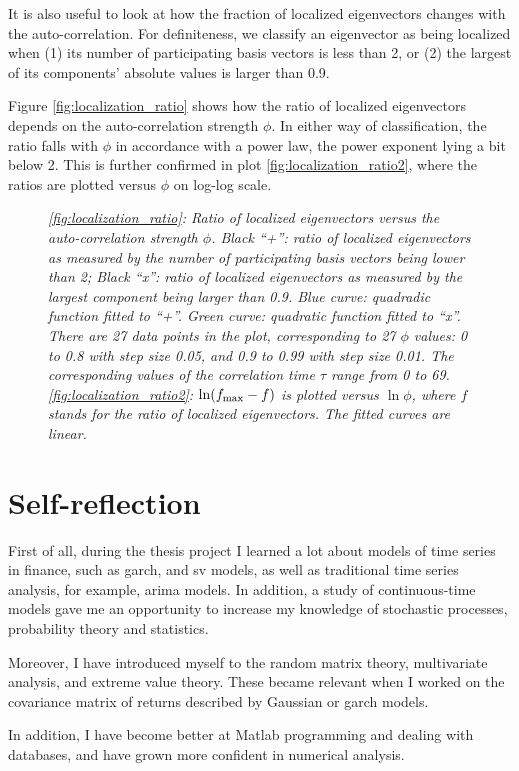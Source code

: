 \documentclass{report}
\begin{document}
It is also useful to look at how the fraction of localized eigenvectors
changes with the auto-correlation. For definiteness, we classify
an eigenvector as being localized when (1) its number of participating
basis vectors is less than 2, or (2) the largest of its components'
absolute values is larger than 0.9.

Figure \ref{fig:localization_ratio} shows how the ratio of localized
eigenvectors depends on the auto-correlation strength $\phi$. In
either way of classification, the ratio falls with $\phi$ in
accordance with a power law, the power exponent lying a bit below 2.
This is further confirmed in plot \ref{fig:localization_ratio2}, where
the ratios are plotted versus $\phi$ on log-log scale.
\begin{figure}[htb!]
  \centering
  \caption{\small \it \ref{fig:localization_ratio}: Ratio of localized
    eigenvectors versus the auto-correlation strength $\phi$. Black
    ``+'': ratio of localized eigenvectors as measured by the number
    of participating basis vectors being lower than 2; Black ``x'':
    ratio of localized eigenvectors as measured by the largest
    component being larger than 0.9. Blue curve: quadradic function
    fitted to ``+''. Green curve: quadratic function fitted to
    ``x''. There are 27 data points in the plot, corresponding to 27
    $\phi$ values: 0 to 0.8 with step size 0.05, and 0.9 to 0.99 with
    step size 0.01. The corresponding values of the correlation time
    $\tau$ range from 0 to 69. \ref{fig:localization_ratio2}: $\ln
    (f_{\text{max}} - f)$ is plotted versus $\ln \phi$, where $f$ stands for the
    ratio of localized eigenvectors. The fitted curves are linear.}
\end{figure}



\chapter{Self-reflection}
First of all, during the thesis project I learned a lot about models
of time series in finance, such as \gls{garch}, and \gls{sv} models,
as well as traditional time series analysis, for example, \gls{arima}
models. In addition, a study of continuous-time models gave me an
opportunity to increase my knowledge of stochastic processes,
probability theory and statistics.

Moreover, I have introduced myself to the random matrix theory,
multivariate analysis, and extreme value theory. These became relevant
when I worked on the covariance matrix of returns described by
Gaussian or \gls{garch} models.

In addition, I have become better at Matlab programming and dealing
with databases, and have grown more confident in numerical analysis.


\appendix




\end{document}
